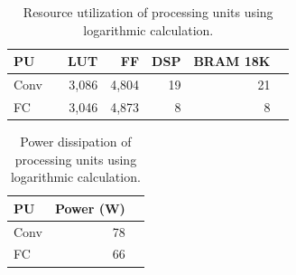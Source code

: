 \begin{table}[!h]\centering
	\caption{Resource utilization of processing units using logarithmic calculation.}\label{tab:resource_log}
	\scriptsize
	\begin{tabular}{lrrrrrr}\toprule
		\textbf{PU} & &\textbf{LUT} &\textbf{FF} &\textbf{DSP} &\textbf{BRAM 18K} \\\midrule
		Conv & &3,086 &4,804 &19 &21 \\
		FC & &3,046 &4,873 &8 &8 \\
		\bottomrule
	\end{tabular}
\end{table}

\begin{table}[!h]\centering
	\caption{Power dissipation of processing units using logarithmic calculation.}\label{tab:power_log}
	\scriptsize
	\begin{tabular}{lrr}\toprule
		\textbf{PU} &\textbf{Power (W)} \\\midrule
		Conv &78 \\
		FC &66 \\
		\bottomrule
	\end{tabular}
\end{table}

